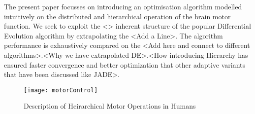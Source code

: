 The present paper focusses on introducing an optimisation algorithm modelled intuitively on the distributed and hierarchical operation of the brain motor function. We seek to exploit the <> inherent structure of the popular Differential Evolution algorithm by extrapolating the <Add a Line>. The algorithm performance is exhaustively compared on the <Add here and connect to different algorithms>.<Why we have extrapolated DE>.<How introducing Hierarchy has ensured faster convergence and better optimization that other adaptive variants that have been discussed like JADE>.

\begin{figure}
  \texttt{[image: motorControl]}
  \caption{Description of Heirarchical Motor Operations in Humans}
  \label{fig:motorControl}
\end{figure}






